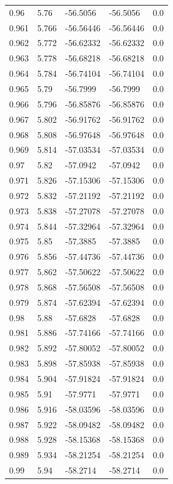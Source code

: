 \begin{tabular}{lllll}
0.96 & 5.76 & -56.5056 & -56.5056 & 0.0 \\
0.961 & 5.766 & -56.56446 & -56.56446 & 0.0 \\
0.962 & 5.772 & -56.62332 & -56.62332 & 0.0 \\
0.963 & 5.778 & -56.68218 & -56.68218 & 0.0 \\
0.964 & 5.784 & -56.74104 & -56.74104 & 0.0 \\
0.965 & 5.79 & -56.7999 & -56.7999 & 0.0 \\
0.966 & 5.796 & -56.85876 & -56.85876 & 0.0 \\
0.967 & 5.802 & -56.91762 & -56.91762 & 0.0 \\
0.968 & 5.808 & -56.97648 & -56.97648 & 0.0 \\
0.969 & 5.814 & -57.03534 & -57.03534 & 0.0 \\
0.97 & 5.82 & -57.0942 & -57.0942 & 0.0 \\
0.971 & 5.826 & -57.15306 & -57.15306 & 0.0 \\
0.972 & 5.832 & -57.21192 & -57.21192 & 0.0 \\
0.973 & 5.838 & -57.27078 & -57.27078 & 0.0 \\
0.974 & 5.844 & -57.32964 & -57.32964 & 0.0 \\
0.975 & 5.85 & -57.3885 & -57.3885 & 0.0 \\
0.976 & 5.856 & -57.44736 & -57.44736 & 0.0 \\
0.977 & 5.862 & -57.50622 & -57.50622 & 0.0 \\
0.978 & 5.868 & -57.56508 & -57.56508 & 0.0 \\
0.979 & 5.874 & -57.62394 & -57.62394 & 0.0 \\
0.98 & 5.88 & -57.6828 & -57.6828 & 0.0 \\
0.981 & 5.886 & -57.74166 & -57.74166 & 0.0 \\
0.982 & 5.892 & -57.80052 & -57.80052 & 0.0 \\
0.983 & 5.898 & -57.85938 & -57.85938 & 0.0 \\
0.984 & 5.904 & -57.91824 & -57.91824 & 0.0 \\
0.985 & 5.91 & -57.9771 & -57.9771 & 0.0 \\
0.986 & 5.916 & -58.03596 & -58.03596 & 0.0 \\
0.987 & 5.922 & -58.09482 & -58.09482 & 0.0 \\
0.988 & 5.928 & -58.15368 & -58.15368 & 0.0 \\
0.989 & 5.934 & -58.21254 & -58.21254 & 0.0 \\
0.99 & 5.94 & -58.2714 & -58.2714 & 0.0 \\

\end{tabular}
